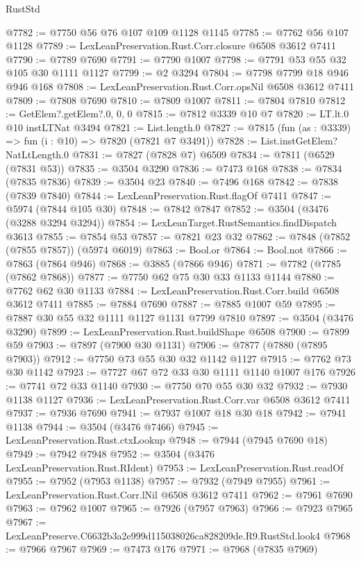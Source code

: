 \begin{lexlean}{RustStd}
\begin{coremodule}
@7782 := @7750 @56 @76 @107 @109 @1128 @1145
@7785 := @7762 @56 @107 @1128
@7789 := LexLeanPreservation.Rust.Corr.closure @6508 @3612 @7411
@7790 := @7789 @7690
@7791 := @7790 @1007
@7798 := @7791 @53 @55 @32 @105 @30 @1111 @1127
@7799 := @2 @3294
@7804 := @7798 @7799 @18 @946 @946 @168
@7808 := LexLeanPreservation.Rust.Corr.opsNil @6508 @3612 @7411
@7809 := @7808 @7690
@7810 := @7809 @1007
@7811 := @7804 @7810
@7812 := GetElem?.getElem?.{0, 0, 0}
@7815 := @7812 @3339 @10 @7
@7820 := LT.lt.{0} @10 instLTNat @3494
@7821 := List.length.{0}
@7827 := @7815 (fun (as : @3339) => fun (i : @10) => @7820 (@7821 @7 @3491))
@7828 := List.instGetElem?NatLtLength.{0}
@7831 := @7827 (@7828 @7) @6509
@7834 := @7811 (@6529 (@7831 @53))
@7835 := @3504 @3290
@7836 := @7473 @168
@7838 := @7834 (@7835 @7836)
@7839 := @3504 @23
@7840 := @7496 @168
@7842 := @7838 (@7839 @7840)
@7844 := LexLeanPreservation.Rust.flagOf @7411
@7847 := @5974 (@7844 @105 @30)
@7848 := @7842 @7847
@7852 := @3504 (@3476 (@3288 @3294 @3294))
@7854 := LexLeanTarget.RustSemantics.findDispatch @3613
@7855 := @7854 @53
@7857 := @7821 @23 @32
@7862 := @7848 (@7852 (@7855 @7857)) (@5974 @6019)
@7863 := Bool.or
@7864 := Bool.not
@7866 := @7863 (@7864 @946)
@7868 := @3885 (@7866 @946)
@7871 := @7782 (@7785 (@7862 @7868))
@7877 := @7750 @62 @75 @30 @33 @1133 @1144
@7880 := @7762 @62 @30 @1133
@7884 := LexLeanPreservation.Rust.Corr.build @6508 @3612 @7411
@7885 := @7884 @7690
@7887 := @7885 @1007 @59
@7895 := @7887 @30 @55 @32 @1111 @1127 @1131 @7799 @7810
@7897 := @3504 (@3476 @3290)
@7899 := LexLeanPreservation.Rust.buildShape @6508
@7900 := @7899 @59
@7903 := @7897 (@7900 @30 @1131)
@7906 := @7877 (@7880 (@7895 @7903))
@7912 := @7750 @73 @55 @30 @32 @1142 @1127
@7915 := @7762 @73 @30 @1142
@7923 := @7727 @67 @72 @33 @30 @1111 @1140 @1007 @176
@7926 := @7741 @72 @33 @1140
@7930 := @7750 @70 @55 @30 @32
@7932 := @7930 @1138 @1127
@7936 := LexLeanPreservation.Rust.Corr.var @6508 @3612 @7411
@7937 := @7936 @7690
@7941 := @7937 @1007 @18 @30 @18
@7942 := @7941 @1138
@7944 := @3504 (@3476 @7466)
@7945 := LexLeanPreservation.Rust.ctxLookup
@7948 := @7944 (@7945 @7690 @18)
@7949 := @7942 @7948
@7952 := @3504 (@3476 LexLeanPreservation.Rust.RIdent)
@7953 := LexLeanPreservation.Rust.readOf
@7955 := @7952 (@7953 @1138)
@7957 := @7932 (@7949 @7955)
@7961 := LexLeanPreservation.Rust.Corr.lNil @6508 @3612 @7411
@7962 := @7961 @7690
@7963 := @7962 @1007
@7965 := @7926 (@7957 @7963)
@7966 := @7923 @7965
@7967 := LexLeanPreserve.C6632b3a2e999d115038026ca828209de.R9.RustStd.look4
@7968 := @7966 @7967
@7969 := @7473 @176
@7971 := @7968 (@7835 @7969)

\end{coremodule}
\end{lexlean}
